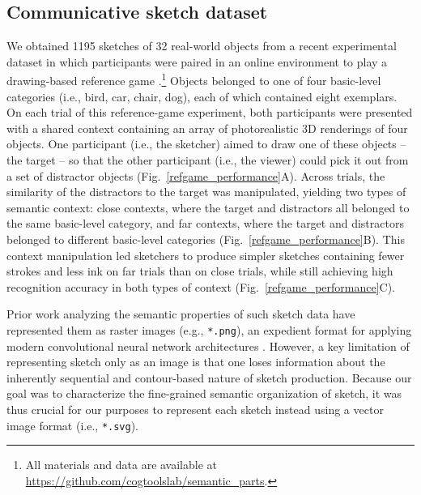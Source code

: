 \documentclass[10pt,letterpaper]{article}
\begin{document}
\subsection{Communicative sketch dataset}
We obtained 1195 sketches of 32 real-world objects from a recent experimental dataset in which participants were paired in an online environment to play a drawing-based reference game \cite{fan2018modeling}.\footnote{All materials and data are available at \url{https://github.com/cogtoolslab/semantic_parts}.}
Objects belonged to one of four basic-level categories (i.e., bird, car, chair, dog), each of which contained eight exemplars. %
On each trial of this reference-game experiment, both participants were presented with a shared context containing an array of photorealistic 3D renderings of four objects.   
One participant (i.e., the sketcher) aimed to draw one of these objects -- the target -- so that the other participant (i.e., the viewer) could pick it out from a set of distractor objects (Fig.~\ref{refgame_performance}A). 
Across trials, the similarity of the distractors to the target was manipulated, yielding two types of semantic context: close contexts, where the target and distractors all belonged to the same basic-level category, and far contexts, where the target and distractors belonged to different basic-level categories (Fig.~\ref{refgame_performance}B). 
This context manipulation led sketchers to produce simpler sketches containing fewer strokes and less ink on far trials than on close trials, while still achieving high recognition accuracy in both types of context (Fig.~\ref{refgame_performance}C). %
 


Prior work analyzing the semantic properties of such sketch data have represented them as raster images (e.g., \texttt{*.png}), an expedient format for applying modern convolutional neural network architectures \cite{FanCommon2018,sangkloy2016sketchy,yu2017sketch}. 
However, a key limitation of representing sketch only as an image is that one loses information about the inherently sequential and contour-based nature of sketch production. 
Because our goal was to characterize the fine-grained semantic organization of sketch, it was thus crucial for our purposes to represent each sketch instead using a vector image format (i.e., \texttt{*.svg}). 
\end{document}
